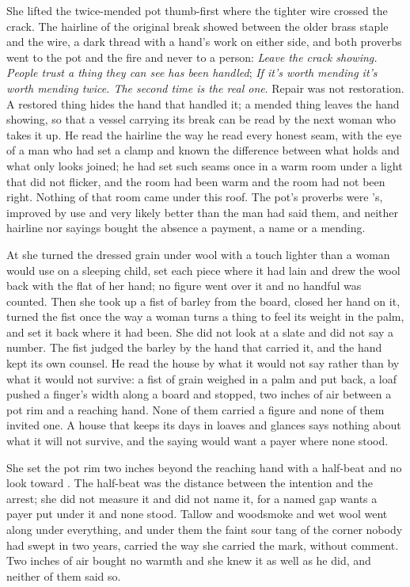 She lifted the twice-mended pot thumb-first where the tighter wire crossed the crack. The hairline of the original break showed between the older brass staple and the wire, a dark thread with a hand's work on either side, and both proverbs went to the pot and the fire and never to a person: \emph{Leave the crack showing. People trust a thing they can see has been handled}; \emph{If it's worth mending it's worth mending twice. The second time is the real one}. Repair was not restoration. A restored thing hides the hand that handled it; a mended thing leaves the hand showing, so that a vessel carrying its break can be read by the next woman who takes it up. He read the hairline the way he read every honest seam, with the eye of a man who had set a clamp and known the difference between what holds and what only looks joined; he had set such seams once in a warm room under a light that did not flicker, and the room had been warm and the room had not been right. Nothing of that room came under this roof. The pot's proverbs were 's, improved by use and very likely better than the man had said them, and neither hairline nor sayings bought the absence a payment, a name or a mending.

At  she turned the dressed grain under wool with a touch lighter than a woman would use on a sleeping child, set each piece where it had lain and drew the wool back with the flat of her hand; no figure went over it and no handful was counted. Then she took up a fist of barley from the board, closed her hand on it, turned the fist once the way a woman turns a thing to feel its weight in the palm, and set it back where it had been. She did not look at a slate and did not say a number. The fist judged the barley by the hand that carried it, and the hand kept its own counsel. He read the house by what it would not say rather than by what it would not survive: a fist of grain weighed in a palm and put back, a loaf pushed a finger's width along a board and stopped, two inches of air between a pot rim and a reaching hand. None of them carried a figure and none of them invited one. A house that keeps its days in loaves and glances says nothing about what it will not survive, and the saying would want a payer where none stood.

She set the pot rim two inches beyond the reaching hand with a half-beat and no look toward . The half-beat was the distance between the intention and the arrest; she did not measure it and did not name it, for a named gap wants a payer put under it and none stood. Tallow and woodsmoke and wet wool went along under everything, and under them the faint sour tang of the corner nobody had swept in two years, carried the way she carried the mark, without comment. Two inches of air bought no warmth and she knew it as well as he did, and neither of them said so.

